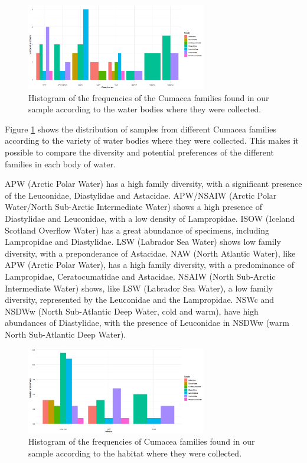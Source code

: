 \begin{figure}[]
    \centering
    \includegraphics[width=0.7\textwidth]{figure3.png}
    \caption{Histogram of the frequencies of the Cumacea families found in our sample according to the water bodies where they were collected. \label{fig:fig3}}
\end{figure}

Figure \ref{fig:fig3} shows the distribution of samples from different Cumacea families according to the variety of water bodies where they were collected. This makes it possible to compare the diversity and potential preferences of the different families in each body of water. 

APW (Arctic Polar Water) has a high family diversity, with a significant presence of the Leuconidae, Diastylidae and Astacidae. APW/NSAIW (Arctic Polar Water/North Sub-Arctic Intermediate Water) shows a high presence of Diastylidae and Leuconidae, with a low density of Lampropidae. ISOW (Iceland Scotland Overflow Water) has a great abundance of specimens, including Lampropidae and  Diastylidae. LSW (Labrador Sea Water) shows low family diversity, with a preponderance of Astacidae. NAW (North Atlantic Water), like APW (Arctic Polar Water), has a high family diversity, with a predominance of Lampropidae, Ceratocumatidae and Astacidae. NSAIW (North Sub-Arctic Intermediate Water) shows, like LSW (Labrador Sea Water), a low family diversity, represented by the Leuconidae and the Lampropidae. NSWc and NSDWw (North Sub-Atlantic Deep Water, cold and warm), have high abundances of Diastylidae, with the presence of Leuconidae in NSDWw (warm North Sub-Atlantic Deep Water).

\begin{figure}[]
    \centering
    \includegraphics[width=0.7\textwidth]{figure4.png}
    \caption{Histogram of the frequencies of Cumacea families found in our sample according to the habitat where they were collected.\label{fig:fig4}}
\end{figure}

